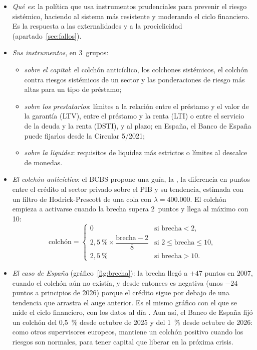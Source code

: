 \documentclass[11pt]{article}
\begin{document}
\begin{itemize}
\item \emph{Qué es}: la política que usa instrumentos prudenciales para prevenir el riesgo sistémico, haciendo al sistema más resistente y moderando el ciclo financiero\nocite{Borio2003Macroprudential,FreixasLaevenPeydro2015}. Es la respuesta a las externalidades y a la prociclicidad (apartado~\ref{sec:fallos}).
\item \emph{Sus instrumentos}, en 3~grupos:
  \begin{itemize}
  \item \emph{sobre el capital}: el colchón anticíclico, los colchones sistémicos, el colchón contra riesgos sistémicos de un sector y las ponderaciones de riesgo más altas para un tipo de préstamo;
  \item \emph{sobre los prestatarios}: límites a la relación entre el préstamo y el valor de la garantía (LTV), entre el préstamo y la renta (LTI) o entre el servicio de la deuda y la renta (DSTI), y al plazo; en España, el Banco de España puede fijarlos desde la Circular 5/2021\nocite{BdE2021Circular5};
  \item \emph{sobre la liquidez}: requisitos de liquidez más estrictos o límites al descalce de monedas.
  \end{itemize}
\item \emph{El colchón anticíclico}: el BCBS propone una guía, la , la diferencia en puntos entre el crédito al sector privado sobre el PIB y su tendencia, estimada con un filtro de Hodrick-Prescott de una cola con $\lambda=400.000$. El colchón empieza a activarse cuando la brecha supera 2~puntos y llega al máximo con 10\nocite{BCBS2010Anticiclico}:
  \begin{equation}\label{eq:cca}
  \text{colchón}=
  \begin{cases}
  0 & \text{si brecha}<2,\\[2pt]
  2{,}5~\%\times\dfrac{\text{brecha}-2}{8} & \text{si }2\leq\text{brecha}\leq10,\\[6pt]
  2{,}5~\% & \text{si brecha}>10.
  \end{cases}
  \end{equation}
\item \emph{El caso de España} (gráfico~\ref{fig:brecha}): la brecha llegó a $+47$ puntos en 2007, cuando el colchón aún no existía, y desde entonces es negativa (unos $-24$ puntos a principios de 2026) porque el crédito sigue por debajo de una tendencia que arrastra el auge anterior\nocite{BIS2026CreditGap}. Es el mismo gráfico con el que se mide el ciclo financiero, con los datos al día . Aun así, el Banco de España fijó un colchón del 0,5~\% desde octubre de 2025 y del 1~\% desde octubre de 2026: como otros supervisores europeos, mantiene un colchón positivo cuando los riesgos son normales, para tener capital que liberar en la próxima crisis\nocite{BOE2025CCA,BdE2026CCA}.
\end{itemize}
\end{document}
